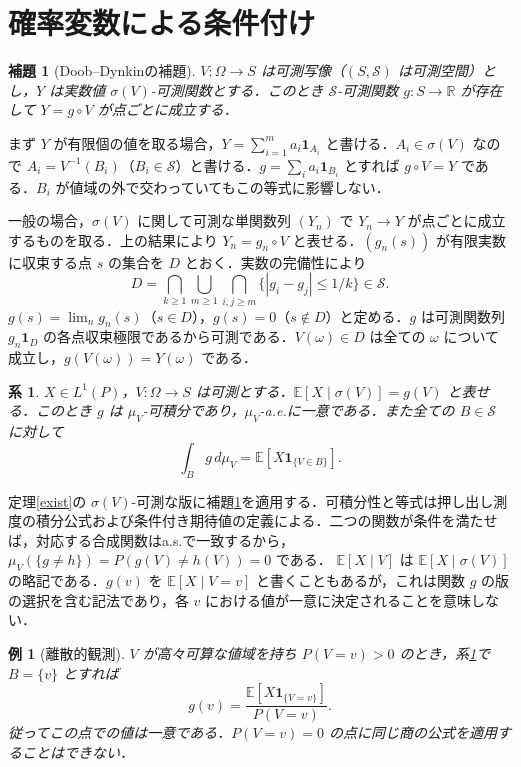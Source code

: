 \documentclass[a5paper,10pt,onecolumn]{jsarticle}
\makeatletter
\theoremstyle{mathnotetheorem}
\newtheorem{lemma}[theorem]{補題}
\newtheorem{corollary}[theorem]{系}
\newtheorem{example}[theorem]{例}
\renewcommand{\proofname}{証明}
\renewenvironment{proof}[1][\proofname]{%
  \par\pushQED{\qed}\normalfont\topsep4\p@\@plus2\p@\relax
  \trivlist\item[\hskip\labelsep\bfseries #1]\ignorespaces
}{\popQED\endtrivlist\@endpefalse}
\newcommand{\R}{\mathbb{R}}
\newcommand{\E}{\mathbb E}
\newcommand{\1}{\mathbf{1}}
\makeatother
\begin{document}
\section{確率変数による条件付け}
\begin{lemma}[Doob--Dynkinの補題]\label{dd}
$V:\Omega\to S$ は可測写像（$(S,\mathcal S)$ は可測空間）とし，$Y$ は実数値 $\sigma(V)$-可測関数とする．このとき $\mathcal S$-可測関数 $g:S\to\R$ が存在して $Y=g\circ V$ が点ごとに成立する．
\end{lemma}
\begin{proof}
まず $Y$ が有限個の値を取る場合，$Y=\sum_{i=1}^m a_i\1_{A_i}$ と書ける．$A_i\in\sigma(V)$ なので $A_i=V^{-1}(B_i)$（$B_i\in\mathcal S$）と書ける．$g=\sum_i a_i\1_{B_i}$ とすれば $g\circ V=Y$ である．$B_i$ が値域の外で交わっていてもこの等式に影響しない．

一般の場合，$\sigma(V)$ に関して可測な単関数列 $(Y_n)$ で $Y_n\to Y$ が点ごとに成立するものを取る．上の結果により $Y_n=g_n\circ V$ と表せる．$(g_n(s))$ が有限実数に収束する点 $s$ の集合を $D$ とおく．実数の完備性により
\[
 D=\bigcap_{k\ge1}\bigcup_{m\ge1}\bigcap_{i,j\ge m}
 \{|g_i-g_j|\le1/k\}\in\mathcal S.
\]
$g(s)=\lim_n g_n(s)$（$s\in D$），$g(s)=0$（$s\notin D$）と定める．$g$ は可測関数列 $g_n\1_D$ の各点収束極限であるから可測である．$V(\omega)\in D$ は全ての $\omega$ について成立し，$g(V(\omega))=Y(\omega)$ である．
\end{proof}
\begin{corollary}\label{givenv}
$X\in L^1(P)$，$V:\Omega\to S$ は可測とする．$\E[X\mid\sigma(V)]=g(V)$ と表せる．このとき $g$ は $\mu_V$-可積分であり，$\mu_V$-a.e.に一意である．また全ての $B\in\mathcal S$ に対して
\[
 \int_Bg\,d\mu_V=\E[X\1_{\{V\in B\}}].
\]
\end{corollary}
\begin{proof}
定理\ref{exist}の $\sigma(V)$-可測な版に補題\ref{dd}を適用する．可積分性と等式は押し出し測度の積分公式および条件付き期待値の定義による．二つの関数が条件を満たせば，対応する合成関数はa.s.で一致するから，$\mu_V(\{g\ne h\})=P(g(V)\ne h(V))=0$ である．
\end{proof}
$\E[X\mid V]$ は $\E[X\mid\sigma(V)]$ の略記である．$g(v)$ を $\E[X\mid V=v]$ と書くこともあるが，これは関数 $g$ の版の選択を含む記法であり，各 $v$ における値が一意に決定されることを意味しない．
\begin{example}[離散的観測]
$V$ が高々可算な値域を持ち $P(V=v)>0$ のとき，系\ref{givenv}で $B=\{v\}$ とすれば
\[
 g(v)=\frac{\E[X\1_{\{V=v\}}]}{P(V=v)}.
\]
従ってこの点での値は一意である．$P(V=v)=0$ の点に同じ商の公式を適用することはできない．
\end{example}
\end{document}
